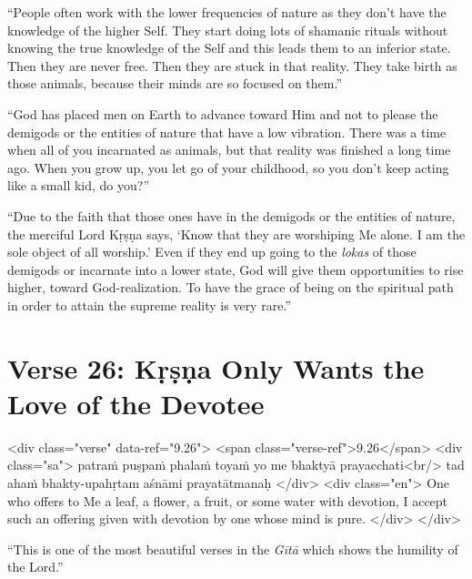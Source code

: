 \enquote{People often work with the lower frequencies of nature as they don’t have the knowledge of the higher Self. They start doing lots of shamanic rituals without knowing the true knowledge of the Self and this leads them to an inferior state. Then they are never free. Then they are stuck in that reality. They take birth as those animals, because their minds are so focused on them.}

\enquote{God has placed men on Earth to advance toward Him and not to please the demigods or the entities of nature that have a low vibration. There was a time when all of you incarnated as animals, but that reality was finished a long time ago. When you grow up, you let go of your childhood, so you don’t keep acting like a small kid, do you?}

\enquote{Due to the faith that those ones have in the demigods or the entities of nature, the merciful Lord Kṛṣṇa says, \enquote{Know that they are worshiping Me alone. I am the sole object of all worship.} Even if they end up going to the \textit{lokas} of those demigods or incarnate into a lower state, God will give them opportunities to rise higher, toward God-realization. To have the grace of being on the spiritual path in order to attain the supreme reality is very rare.}

\section{Verse 26: Kṛṣṇa Only Wants the Love of the Devotee}\label{sec-verse-26-krsna-only-wants-the-love-of-the-devotee}


\begin{html}
<div class="verse" data-ref="9.26">
  <span class="verse-ref">9.26</span>
  <div class="sa">
    patraṁ puṣpaṁ phalaṁ toyaṁ yo me bhaktyā prayacchati<br/>
    tad ahaṁ bhakty-upahṛtam aśnāmi prayatātmanaḥ
  </div>
  <div class="en">
    One who offers to Me a leaf, a flower, a fruit, or some water with devotion, I accept such an offering given with devotion by one whose mind is pure.
  </div>
</div>
\end{html}


\enquote{This is one of the most beautiful verses in the \textit{Gītā} which shows the humility of the Lord.}

